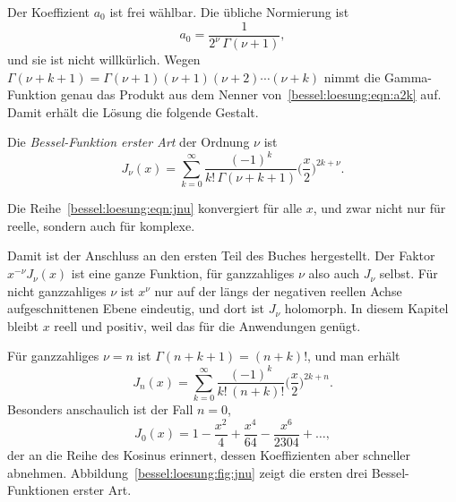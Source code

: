 Der Koeffizient $a_0$ ist frei wählbar.
Die übliche Normierung ist
\begin{equation}
a_0
=
\frac{1}{2^\nu\,\Gamma(\nu+1)},
\label{bessel:loesung:eqn:normierung}
\end{equation}
und sie ist nicht willkürlich.
Wegen $\Gamma(\nu+k+1) = \Gamma(\nu+1)(\nu+1)(\nu+2)\cdots(\nu+k)$ nimmt die Gamma-Funktion genau das Produkt aus dem Nenner von~\eqref{bessel:loesung:eqn:a2k} auf.
Damit erhält die Lösung die folgende Gestalt.
\begin{definition}
\label{bessel:loesung:def:jnu}
Die \emph{Bessel-Funktion erster Art} der Ordnung $\nu$
%
ist
\begin{equation}
J_\nu(x)
=
\sum_{k=0}^\infty
\frac{(-1)^k}{k!\,\Gamma(\nu+k+1)}
\biggl(\frac{x}{2}\biggr)^{2k+\nu}.
\label{bessel:loesung:eqn:jnu}
\end{equation}
\end{definition}

Die Reihe~\eqref{bessel:loesung:eqn:jnu} konvergiert für alle $x$, und zwar nicht nur für reelle, sondern auch für komplexe.

Damit ist der Anschluss an den ersten Teil des Buches hergestellt.
Der Faktor $x^{-\nu}J_\nu(x)$ ist eine ganze Funktion, für ganzzahliges $\nu$ also auch $J_\nu$ selbst.
Für nicht ganzzahliges $\nu$ ist $x^\nu$ nur auf der längs der negativen reellen Achse aufgeschnittenen Ebene eindeutig, und dort ist $J_\nu$ holomorph.
In diesem Kapitel bleibt $x$ reell und positiv, weil das für die Anwendungen genügt.

Für ganzzahliges $\nu=n$ ist $\Gamma(n+k+1)=(n+k)!$, und man erhält
\[
J_n(x)
=
\sum_{k=0}^\infty
\frac{(-1)^k}{k!\,(n+k)!}
\biggl(\frac{x}{2}\biggr)^{2k+n}.
\]
Besonders anschaulich ist der Fall $n=0$,
\[
J_0(x)
=
1
-
\frac{x^2}{4}
+
\frac{x^4}{64}
-
\frac{x^6}{2304}
+
\dots,
\]
der an die Reihe des Kosinus erinnert, dessen Koeffizienten aber schneller abnehmen.
Abbildung~\ref{bessel:loesung:fig:jnu} zeigt die ersten drei
Bessel-Funktionen erster Art.


